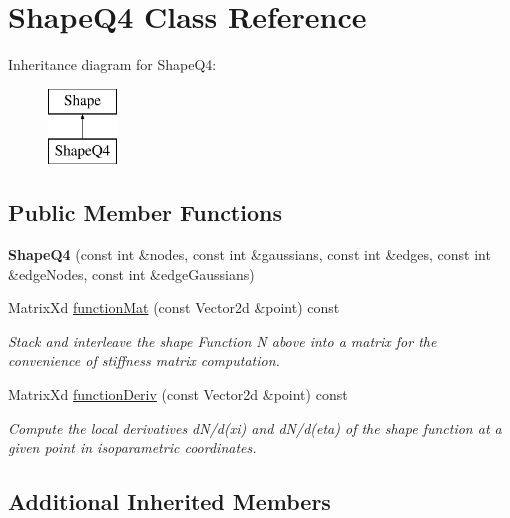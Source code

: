 \hypertarget{class_shape_q4}{}\section{Shape\+Q4 Class Reference}
\label{class_shape_q4}
Inheritance diagram for Shape\+Q4\+:\begin{figure}[H]
\begin{center}
\leavevmode
\includegraphics[height=2.000000cm]{class_shape_q4}
\end{center}
\end{figure}
\subsection*{Public Member Functions}
\begin{DoxyCompactItemize}
\item 
\mbox{\label{class_shape_q4_abc1b0382e7d9c3432764e739a31cfec0}} 
{\bfseries Shape\+Q4} (const int \&nodes, const int \&gaussians, const int \&edges, const int \&edge\+Nodes, const int \&edge\+Gaussians)
\item 
Matrix\+Xd \mbox{\hyperlink{class_shape_q4_a9a74aff61bbcbfa73480cbe520a21563}{function\+Mat}} (const Vector2d \&point) const
\begin{DoxyCompactList}\small\item\em Stack and interleave the shape Function N above into a matrix for the convenience of stiffness matrix computation. \end{DoxyCompactList}\item 
Matrix\+Xd \mbox{\hyperlink{class_shape_q4_a23e45399e8867f74c47eb41a30328e3e}{function\+Deriv}} (const Vector2d \&point) const
\begin{DoxyCompactList}\small\item\em Compute the local derivatives d\+N/d(xi) and d\+N/d(eta) of the shape function at a given point in isoparametric coordinates. \end{DoxyCompactList}\end{DoxyCompactItemize}
\subsection*{Additional Inherited Members}



